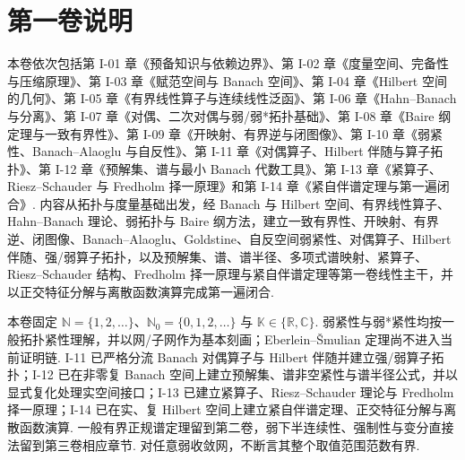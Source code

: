 \chapter*{第一卷说明}
本卷依次包括第 I-01 章《预备知识与依赖边界》、第 I-02 章《度量空间、完备性与压缩原理》、第 I-03 章《赋范空间与 Banach 空间》、第 I-04 章《Hilbert 空间的几何》、第 I-05 章《有界线性算子与连续线性泛函》、第 I-06 章《Hahn--Banach 与分离》、第 I-07 章《对偶、二次对偶与弱/弱*拓扑基础》、第 I-08 章《Baire 纲定理与一致有界性》、第 I-09 章《开映射、有界逆与闭图像》、第 I-10 章《弱紧性、Banach--Alaoglu 与自反性》、第 I-11 章《对偶算子、Hilbert 伴随与算子拓扑》、第 I-12 章《预解集、谱与最小 Banach 代数工具》、第 I-13 章《紧算子、Riesz--Schauder 与 Fredholm 择一原理》和第 I-14 章《紧自伴谱定理与第一遍闭合》. 内容从拓扑与度量基础出发，经 Banach 与 Hilbert 空间、有界线性算子、Hahn--Banach 理论、弱拓扑与 Baire 纲方法，建立一致有界性、开映射、有界逆、闭图像、Banach--Alaoglu、Goldstine、自反空间弱紧性、对偶算子、Hilbert 伴随、强/弱算子拓扑，以及预解集、谱、谱半径、多项式谱映射、紧算子、Riesz--Schauder 结构、Fredholm 择一原理与紧自伴谱定理等第一卷线性主干，并以正交特征分解与离散函数演算完成第一遍闭合.

本卷固定 \(\displaystyle \mathbb N=\{1,2,\dots\}\)、\(\displaystyle \mathbb N_0=\{0,1,2,\dots\}\) 与 \(\displaystyle \mathbb K\in\{\mathbb R,\mathbb C\}\). 弱紧性与弱*紧性均按一般拓扑紧性理解，并以网/子网作为基本刻画；Eberlein--\v Smulian 定理尚不进入当前证明链. I-11 已严格分流 Banach 对偶算子与 Hilbert 伴随并建立强/弱算子拓扑；I-12 已在非零复 Banach 空间上建立预解集、谱非空紧性与谱半径公式，并以显式复化处理实空间接口；I-13 已建立紧算子、Riesz--Schauder 理论与 Fredholm 择一原理；I-14 已在实、复 Hilbert 空间上建立紧自伴谱定理、正交特征分解与离散函数演算. 一般有界正规谱定理留到第二卷，弱下半连续性、强制性与变分直接法留到第三卷相应章节. 对任意弱收敛网，不断言其整个取值范围范数有界.
